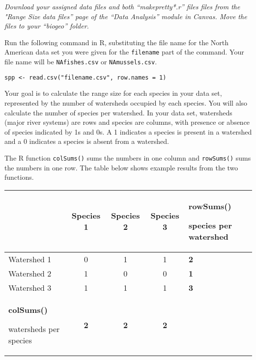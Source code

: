 \documentclass[11pt]{article}
\begin{document}
\textit{Download your assigned data files and both “makepretty*.r” files files from the "Range Size data files” page of the “Data Analysis” module in Canvas. Move the files to your “biogeo” folder.}

Run the following command in R, substituting the file name for the North American
data set you were given for the \texttt{filename} part of the command. Your file name 
will be \texttt{NAfishes.csv} or \texttt{NAmussels.csv}. 


\texttt{spp \textless{}-
read.csv("filename.csv", row.names = 1)}

%

Your goal is to calculate the range size for each species in your
data set, represented by the number of watersheds occupied by each
species. You will also calculate the number of species per watershed. In your 
data set, watersheds (major river systems) are rows and species are columns, with presence or absence of
species indicated by 1s and 0s. A 1 indicates a species is present in a
watershed and a 0 indicates a species is absent from a watershed.

The R function \texttt{colSums()} sums the numbers in one column and \texttt{rowSums()} 
sums the numbers in one row. The table below shows example results from the 
two functions.

\label{tab:colrowsums}
\begin{longtable}[c]{@{}L{1.5in}cccC{1.5in}@{}}
\toprule
& Species 1 & Species 2 & Species 3 & \textbf{rowSums()}

species per watershed\tabularnewline
\midrule
\endhead
Watershed 1 & 0 & 1 & 1 & \textbf{2}\tabularnewline
Watershed 2 & 1 & 0 & 0 & \textbf{1}\tabularnewline
Watershed 3 & 1 & 1 & 1 & \textbf{3}\tabularnewline
\textbf{colSums()}

watersheds per species & \textbf{2} & \textbf{2} & \textbf{2}
&\tabularnewline
\bottomrule
\end{longtable}
\end{document}
